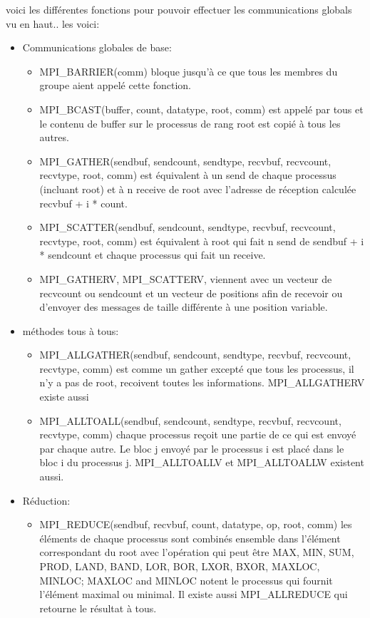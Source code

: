 \documentclass[oneside]{book}
\begin{document}
voici les différentes fonctions pour pouvoir effectuer les communications globals vu en haut.. les voici:\\
\begin{itemize}
\item Communications globales de base:\\
\begin{itemize}
\item MPI\_BARRIER(comm) bloque jusqu'à ce que tous les
membres du groupe aient appelé cette fonction.
\item MPI\_BCAST(buffer, count, datatype, root, comm) est
appelé par tous et le contenu de buffer sur le processus
de rang root est copié à tous les autres.
\item MPI\_GATHER(sendbuf, sendcount, sendtype, recvbuf,
recvcount, recvtype, root, comm) est équivalent à un send
de chaque processus (incluant root) et à n receive de root
avec l'adresse de réception calculée recvbuf + i * count.

\item MPI\_SCATTER(sendbuf, sendcount, sendtype, recvbuf,
recvcount, recvtype, root, comm) est équivalent à root qui
fait n send de sendbuf + i * sendcount et chaque
processus qui fait un receive.

\item MPI\_GATHERV, MPI\_SCATTERV, viennent avec un
vecteur de recvcount ou sendcount et un vecteur de
positions afin de recevoir ou d'envoyer des messages de
taille différente à une position variable.
\end{itemize}

\item méthodes tous à tous:\\
\begin{itemize}
\item MPI\_ALLGATHER(sendbuf, sendcount, sendtype, recvbuf,
recvcount, recvtype, comm) est comme un gather excepté que
tous les processus, il n'y a pas de root, recoivent toutes les
informations. MPI\_ALLGATHERV existe aussi

\item MPI\_ALLTOALL(sendbuf, sendcount, sendtype, recvbuf,
recvcount, recvtype, comm) chaque processus reçoit une
partie de ce qui est envoyé par chaque autre. Le bloc j envoyé
par le processus i est placé dans le bloc i du processus j.
MPI\_ALLTOALLV et MPI\_ALLTOALLW existent aussi.
\end{itemize}

\item Réduction:
\begin{itemize}
\item MPI\_REDUCE(sendbuf, recvbuf, count, datatype, op, root,
comm) les éléments de chaque processus sont combinés
ensemble dans l'élément correspondant du root avec
l'opération qui peut être MAX, MIN, SUM, PROD, LAND,
BAND, LOR, BOR, LXOR, BXOR, MAXLOC, MINLOC;
MAXLOC and MINLOC notent le processus qui fournit
l'élément maximal ou minimal. Il existe aussi
MPI\_ALLREDUCE qui retourne le résultat à tous.


\end{itemize}
\end{itemize}
\end{document}
